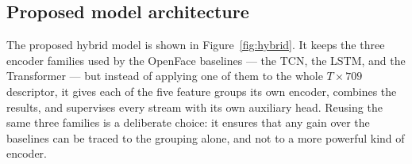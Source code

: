 \documentclass[../main.tex]{subfiles}
\begin{document}
\FloatBarrier
\subsection{Proposed model architecture}

The proposed hybrid model is shown in Figure~\ref{fig:hybrid}. It keeps the three encoder families used by the OpenFace baselines --- the TCN, the LSTM, and the Transformer --- but instead of applying one of them to the whole $T\times709$ descriptor, it gives each of the five feature groups its own encoder, combines the results, and supervises every stream with its own auxiliary head. Reusing the same three families is a deliberate choice: it ensures that any gain over the baselines can be traced to the grouping alone, and not to a more powerful kind of encoder.
\end{document}

